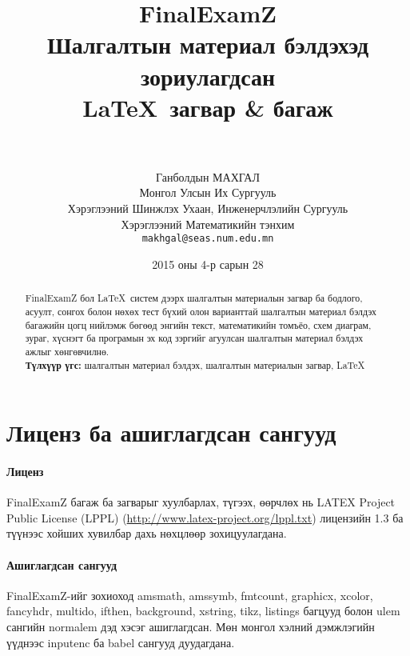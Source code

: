 \documentclass[10pt]{article}
\theoremstyle{definition}
\begin{document}
\title{
  {\Huge FinalExamZ} \\[2mm] Шалгалтын материал бэлдэхэд зориулагдсан \\ \LaTeX\, загвар \& багаж \\[2mm] \large\version \\[2mm] \normalsize \svn}
\author{
  Ганболдын МАХГАЛ\\
  Монгол Улсын Их Сургууль\\
  Хэрэглээний Шинжлэх Ухаан, Инженерчлэлийн Сургууль\\
  Хэрэглээний Математикийн тэнхим\\[2mm]
  \texttt{makhgal@seas.num.edu.mn} \\[2mm]
  \www}
\newcommand{\version}{v1.2.0}
\newcommand{\www}{\url{http://www.galaa.mn/}}
\newcommand{\svn}{\url{https://github.com/galaamn/FinalExamZ}}
\date{2015 оны 4-р сарын 28}
\maketitle

\begin{abstract}
FinalExamZ бол \LaTeX\, систем дээрх шалгалтын материалын загвар ба бодлого, асуулт, сонгох болон нөхөх тест бүхий олон варианттай шалгалтын материал бэлдэх багажийн цогц нийлэмж бөгөөд энгийн текст, математикийн томъёо, схем диаграм, зураг, хүснэгт ба програмын эх код зэргийг агуулсан шалгалтын материал бэлдэх ажлыг хөнгөвчилнө.\\[2mm]
\textbf{Түлхүүр үгс:} шалгалтын материал бэлдэх, шалгалтын материалын загвар, \LaTeX
\end{abstract}

\tableofcontents

\section{Лиценз ба ашиглагдсан сангууд}\label{license}

\paragraph{Лиценз} FinalExamZ багаж ба загварыг хуулбарлах, түгээх, өөрчлөх нь LATEX Project Public License (LPPL) (\url{http://www.latex-project.org/lppl.txt}) лицензийн 1.3 ба түүнээс хойших хувилбар дахь нөхцлөөр зохицуулагдана.

\paragraph{Ашиглагдсан сангууд} FinalExamZ-ийг зохиоход amsmath, amssymb, fmtcount, graphicx, xcolor, fancyhdr, multido, ifthen, background, xstring, tikz, listings багцууд болон ulem сангийн normalem дэд хэсэг ашиглагдсан. Мөн монгол хэлний дэмжлэгийн үүднээс inputenc ба babel сангууд дуудагдана.
\end{document}
